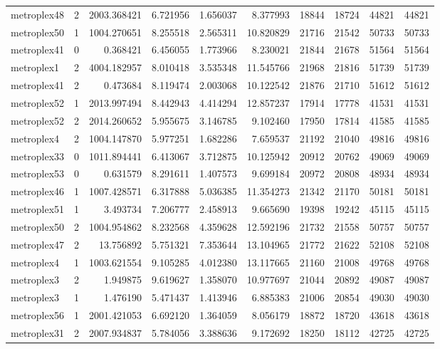 \begin{longtable}{|l|r|r|r|r|r|r|r|r|r|}
metroplex48 & 2 & 2003.368421 & 6.721956 & 1.656037 & 8.377993 & 18844 & 18724 & 44821 & 44821 \\
metroplex50 & 1 & 1004.270651 & 8.255518 & 2.565311 & 10.820829 & 21716 & 21542 & 50733 & 50733 \\
metroplex41 & 0 & 0.368421 & 6.456055 & 1.773966 & 8.230021 & 21844 & 21678 & 51564 & 51564 \\
metroplex1 & 2 & 4004.182957 & 8.010418 & 3.535348 & 11.545766 & 21968 & 21816 & 51739 & 51739 \\
metroplex41 & 2 & 0.473684 & 8.119474 & 2.003068 & 10.122542 & 21876 & 21710 & 51612 & 51612 \\
metroplex52 & 1 & 2013.997494 & 8.442943 & 4.414294 & 12.857237 & 17914 & 17778 & 41531 & 41531 \\
metroplex52 & 2 & 2014.260652 & 5.955675 & 3.146785 & 9.102460 & 17950 & 17814 & 41585 & 41585 \\
metroplex4 & 2 & 1004.147870 & 5.977251 & 1.682286 & 7.659537 & 21192 & 21040 & 49816 & 49816 \\
metroplex33 & 0 & 1011.894441 & 6.413067 & 3.712875 & 10.125942 & 20912 & 20762 & 49069 & 49069 \\
metroplex53 & 0 & 0.631579 & 8.291611 & 1.407573 & 9.699184 & 20972 & 20808 & 48934 & 48934 \\
metroplex46 & 1 & 1007.428571 & 6.317888 & 5.036385 & 11.354273 & 21342 & 21170 & 50181 & 50181 \\
metroplex51 & 1 & 3.493734 & 7.206777 & 2.458913 & 9.665690 & 19398 & 19242 & 45115 & 45115 \\
metroplex50 & 2 & 1004.954862 & 8.232568 & 4.359628 & 12.592196 & 21732 & 21558 & 50757 & 50757 \\
metroplex47 & 2 & 13.756892 & 5.751321 & 7.353644 & 13.104965 & 21772 & 21622 & 52108 & 52108 \\
metroplex4 & 1 & 1003.621554 & 9.105285 & 4.012380 & 13.117665 & 21160 & 21008 & 49768 & 49768 \\
metroplex3 & 2 & 1.949875 & 9.619627 & 1.358070 & 10.977697 & 21044 & 20892 & 49087 & 49087 \\
metroplex3 & 1 & 1.476190 & 5.471437 & 1.413946 & 6.885383 & 21006 & 20854 & 49030 & 49030 \\
metroplex56 & 1 & 2001.421053 & 6.692120 & 1.364059 & 8.056179 & 18872 & 18720 & 43618 & 43618 \\
metroplex31 & 2 & 2007.934837 & 5.784056 & 3.388636 & 9.172692 & 18250 & 18112 & 42725 & 42725 \\

\end{longtable}
